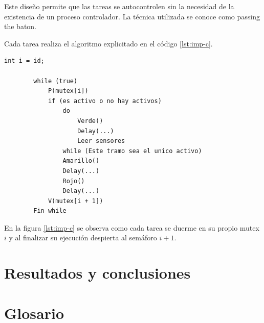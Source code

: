 	Este diseño permite que las tareas se autocontrolen sin la necesidad de la existencia de un proceso controlador.
	La técnica utilizada se conoce como passing the baton.

	Cada tarea realiza el algoritmo explicitado en el código \ref{lst:imp-c}.

	\begin{lstlisting}[label=lst:imp-c, caption=Pseudocódigo del programa que corre cada tarea en la implementación C.]
		int i = id;

		while (true)
			P(mutex[i])
			if (es activo o no hay activos)
				do
					Verde()
					Delay(...)
					Leer sensores
				while (Este tramo sea el unico activo)
				Amarillo()
				Delay(...)
				Rojo()
				Delay(...)
			V(mutex[i + 1])
		Fin while
	\end{lstlisting}

	En la figura \ref{lst:imp-c} se observa como cada tarea se duerme en su propio mutex $i$ y al finalizar su ejecución despierta al semáforo $i+1$.



\section{Resultados y conclusiones}




\section{Glosario}
